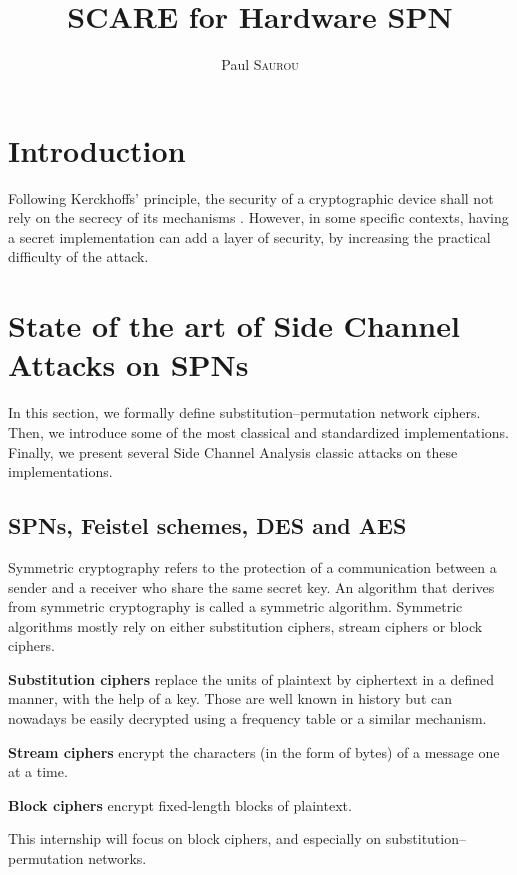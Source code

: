 \documentclass[11pt]{sdm}
\title{SCARE for Hardware SPN}
\author{Paul \textsc{Saurou}}
\begin{document}
\maketitle


\section*{Introduction}

Following Kerckhoffs' principle, the security of a cryptographic device shall not rely on the secrecy of its mechanisms \parencite{Kerckhoffs_1883}.
However, in some specific contexts, having a secret implementation can add a layer of security, by increasing the practical difficulty of the attack.

\section{State of the art of Side Channel Attacks on SPNs}

In this section, we formally define substitution–permutation network ciphers.
Then, we introduce some of the most classical and standardized implementations.
Finally, we present several Side Channel Analysis classic attacks on these implementations.

\subsection{SPNs, Feistel schemes, DES and AES}

Symmetric cryptography refers to the protection of a communication between a sender and a receiver who share the same secret key.
An algorithm that derives from symmetric cryptography is called a symmetric algorithm.
Symmetric algorithms mostly rely on either substitution ciphers, stream ciphers or block ciphers.

\textbf{Substitution ciphers} replace the units of plaintext by ciphertext in a defined manner, with the help of a key.
Those are well known in history but can nowadays be easily decrypted using a frequency table or a similar mechanism.

\textbf{Stream ciphers} encrypt the characters (in the form of bytes) of a message one at a time.

\textbf{Block ciphers} encrypt fixed-length blocks of plaintext.

This internship will focus on block ciphers, and especially on substitution–permutation networks.
\end{document}
